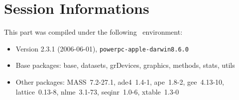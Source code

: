 \documentclass{article}
\begin{document}
\section{Session Informations}

This part was compiled under the following \Rlogo{}~environment:

\begin{itemize}
  \item Version 2.3.1 (2006-06-01), \verb|powerpc-apple-darwin8.6.0|
  \item Base packages: base, datasets, grDevices, graphics, methods,
    stats, utils
  \item Other packages: MASS~7.2-27.1, ade4~1.4-1, ape~1.8-2,
    gee~4.13-10, lattice~0.13-8, nlme~3.1-73, seqinr~1.0-6,
    xtable~1.3-0
\end{itemize}

%
%
\clearpage
{}


\end{document}
